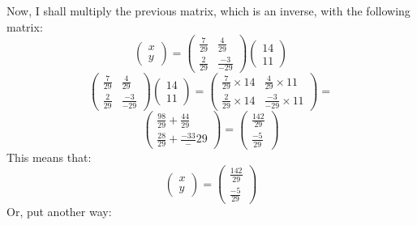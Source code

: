 \documentclass[a4paper,10pt]{article}
\begin{document}
      Now, I shall multiply the previous matrix, which is an inverse, with the following matrix:
      \begin{equation*}
	       \begin{pmatrix}
           x\\y
	       \end{pmatrix}
         =
         \begin{pmatrix}
           \frac{7}{29} & \frac{4}{29}\\
           \frac{2}{29} & \frac{-3}{-29}
         \end{pmatrix}
         \begin{pmatrix}
           14\\11
         \end{pmatrix}

      \end{equation*}
      \begin{equation*}
        \begin{pmatrix}
          \frac{7}{29} & \frac{4}{29}\\
          \frac{2}{29} & \frac{-3}{-29}
        \end{pmatrix}
        \begin{pmatrix}
          14\\11
        \end{pmatrix}
         =
        \begin{pmatrix}
          \frac{7}{29} \times 14 & \frac{4}{29} \times 11\\
          \frac{2}{29} \times 14 & \frac{-3}{-29} \times 11
        \end{pmatrix}
         =
      \end{equation*}
      \begin{equation*}
        \begin{pmatrix}
          \frac{98}{29} + \frac{44}{29}\\
          \frac{28}{29} + \frac{-33}-{29}
        \end{pmatrix}
         =
        \begin{pmatrix}
          \frac{142}{29}\\\frac{-5}{29}
        \end{pmatrix}
      \end{equation*}
      This means that:
      \begin{equation*}
        \begin{pmatrix}
          x\\y
        \end{pmatrix}
         =
        \begin{pmatrix}
          \frac{142}{29}\\\frac{-5}{29}
        \end{pmatrix}
      \end{equation*}
      Or, put another way:
\end{document}
